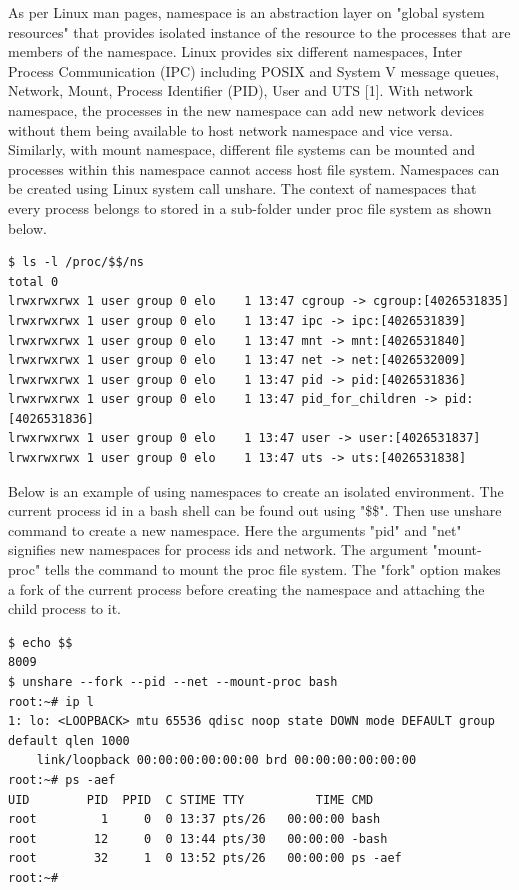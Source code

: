 \documentclass[english, 12pt, a4paper, elec, utf8, a-1b, online]{aaltothesis}
\begin{document}
As per Linux man pages, namespace is an abstraction layer on "global system resources" that provides isolated instance of the resource to the processes that are members of the namespace. Linux provides six different namespaces, Inter Process Communication (IPC) including POSIX and System V message queues, Network, Mount, Process Identifier (PID), User and UTS [1]. With network namespace, the processes in the new namespace can add new network devices without them being available to host network namespace and vice versa. Similarly, with mount namespace, different file systems can be mounted and processes within this namespace cannot access host file system. Namespaces can be created using Linux system call unshare. The context of namespaces that every process belongs to stored in a sub-folder under proc file system as shown below.
\begin{verbatim}
$ ls -l /proc/$$/ns
total 0
lrwxrwxrwx 1 user group 0 elo    1 13:47 cgroup -> cgroup:[4026531835]
lrwxrwxrwx 1 user group 0 elo    1 13:47 ipc -> ipc:[4026531839]
lrwxrwxrwx 1 user group 0 elo    1 13:47 mnt -> mnt:[4026531840]
lrwxrwxrwx 1 user group 0 elo    1 13:47 net -> net:[4026532009]
lrwxrwxrwx 1 user group 0 elo    1 13:47 pid -> pid:[4026531836]
lrwxrwxrwx 1 user group 0 elo    1 13:47 pid_for_children -> pid:[4026531836]
lrwxrwxrwx 1 user group 0 elo    1 13:47 user -> user:[4026531837]
lrwxrwxrwx 1 user group 0 elo    1 13:47 uts -> uts:[4026531838]

\end{verbatim}

Below is an example of using namespaces to create an isolated environment. The current process id in a bash shell can be found out using "\$\$". Then use unshare command to create a new namespace. Here the arguments "pid" and "net" signifies new namespaces for process ids and network. The argument "mount-proc" tells the command to mount the proc file system. The "fork" option makes a fork of the current process before creating the namespace and attaching the child process to it. 

\begin{verbatim}
$ echo $$ 
8009
$ unshare --fork --pid --net --mount-proc bash
root:~# ip l
1: lo: <LOOPBACK> mtu 65536 qdisc noop state DOWN mode DEFAULT group default qlen 1000
    link/loopback 00:00:00:00:00:00 brd 00:00:00:00:00:00
root:~# ps -aef
UID        PID  PPID  C STIME TTY          TIME CMD
root         1     0  0 13:37 pts/26   00:00:00 bash
root        12     0  0 13:44 pts/30   00:00:00 -bash
root        32     1  0 13:52 pts/26   00:00:00 ps -aef
root:~#                                  
\end{verbatim}
\end{document}
